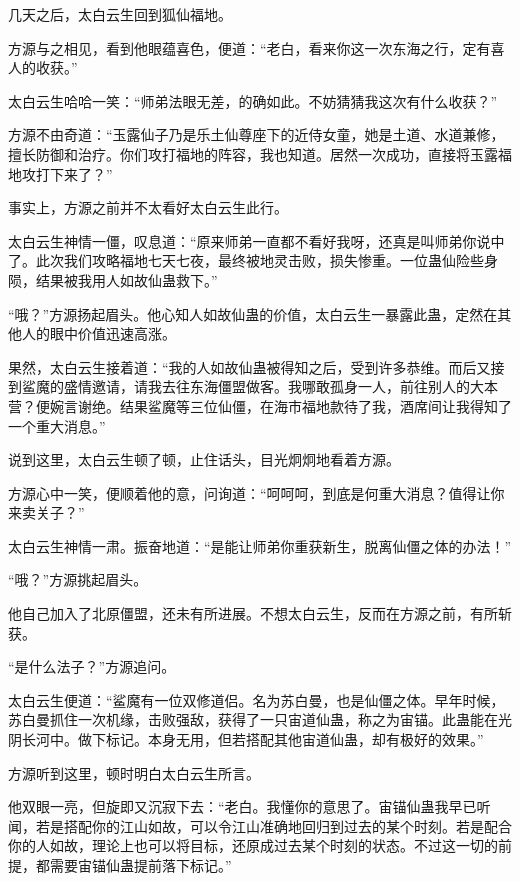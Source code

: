 
\begin{this_body}



几天之后，太白云生回到狐仙福地。

方源与之相见，看到他眼蕴喜色，便道：“老白，看来你这一次东海之行，定有喜人的收获。”

太白云生哈哈一笑：“师弟法眼无差，的确如此。不妨猜猜我这次有什么收获？”

方源不由奇道：“玉露仙子乃是乐土仙尊座下的近侍女童，她是土道、水道兼修，擅长防御和治疗。你们攻打福地的阵容，我也知道。居然一次成功，直接将玉露福地攻打下来了？”

事实上，方源之前并不太看好太白云生此行。

太白云生神情一僵，叹息道：“原来师弟一直都不看好我呀，还真是叫师弟你说中了。此次我们攻略福地七天七夜，最终被地灵击败，损失惨重。一位蛊仙险些身陨，结果被我用人如故仙蛊救下。”

“哦？”方源扬起眉头。他心知人如故仙蛊的价值，太白云生一暴露此蛊，定然在其他人的眼中价值迅速高涨。

果然，太白云生接着道：“我的人如故仙蛊被得知之后，受到许多恭维。而后又接到鲨魔的盛情邀请，请我去往东海僵盟做客。我哪敢孤身一人，前往别人的大本营？便婉言谢绝。结果鲨魔等三位仙僵，在海市福地款待了我，酒席间让我得知了一个重大消息。”

说到这里，太白云生顿了顿，止住话头，目光炯炯地看着方源。

方源心中一笑，便顺着他的意，问询道：“呵呵呵，到底是何重大消息？值得让你来卖关子？”

太白云生神情一肃。振奋地道：“是能让师弟你重获新生，脱离仙僵之体的办法！”

“哦？”方源挑起眉头。

他自己加入了北原僵盟，还未有所进展。不想太白云生，反而在方源之前，有所斩获。

“是什么法子？”方源追问。

太白云生便道：“鲨魔有一位双修道侣。名为苏白曼，也是仙僵之体。早年时候，苏白曼抓住一次机缘，击败强敌，获得了一只宙道仙蛊，称之为宙锚。此蛊能在光阴长河中。做下标记。本身无用，但若搭配其他宙道仙蛊，却有极好的效果。”

方源听到这里，顿时明白太白云生所言。

他双眼一亮，但旋即又沉寂下去：“老白。我懂你的意思了。宙锚仙蛊我早已听闻，若是搭配你的江山如故，可以令江山准确地回归到过去的某个时刻。若是配合你的人如故，理论上也可以将目标，还原成过去某个时刻的状态。不过这一切的前提，都需要宙锚仙蛊提前落下标记。”


\end{this_body}
